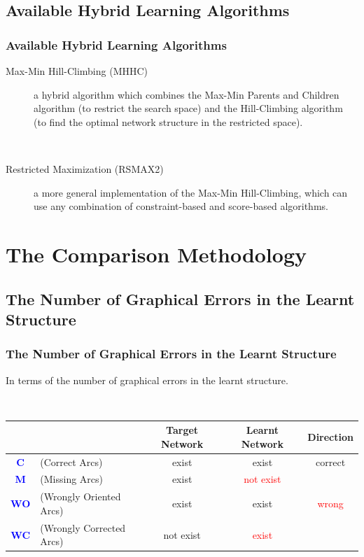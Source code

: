 \documentclass{beamer}
\begin{document}
\subsection{Available Hybrid Learning Algorithms}
\begin{frame}
\frametitle{Available Hybrid Learning Algorithms}
{\scriptsize{}
\begin{description}
\item[Max-Min Hill-Climbing (MHHC)] a hybrid algorithm which combines the Max-Min Parents and Children algorithm (to restrict the search space) and the Hill-Climbing algorithm (to find the optimal network structure in the restricted space).

{}\

\item[Restricted Maximization (RSMAX2)] a more general implementation of the Max-Min Hill-Climbing, which can use any combination of constraint-based and score-based algorithms.
\end{description}
}
\end{frame}



\section{The Comparison Methodology}
\subsection{The Number of Graphical Errors in the Learnt Structure}
\begin{frame}
\frametitle{The Number of Graphical Errors in the Learnt Structure}
{\scriptsize{}

In terms of the number of graphical errors in the learnt structure.

{}\
	
\begin{center}
\begin{tabular}{c|l|c|c|c}
\hline 
& & \textbf{Target Network} & \textbf{Learnt Network} & \textbf{Direction}\tabularnewline
\hline 
\textbf{\textcolor{blue}{C}} & (Correct Arcs) & exist & exist & correct\tabularnewline
\textbf{\textcolor{blue}{M}} & (Missing Arcs) & exist & \textcolor{red}{not exist} & \tabularnewline
\textbf{\textcolor{blue}{WO}} & (Wrongly Oriented Arcs) & exist & exist & \textcolor{red}{wrong}\tabularnewline
\textbf{\textcolor{blue}{WC}} & (Wrongly Corrected Arcs) & not exist & \textcolor{red}{exist} & \tabularnewline
\hline 
\end{tabular}
\end{center}
}
\end{frame}
\end{document}
